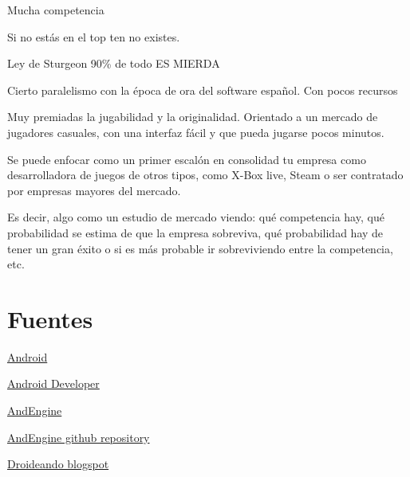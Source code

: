 \documentclass[12 pt, a4paper, twoside]{article}
\begin{document}
Mucha competencia

Si no estás en el top ten no existes.

Ley de Sturgeon 90\% de todo ES MIERDA

Cierto paralelismo con la época de ora del software español. Con pocos
recursos

Muy premiadas la jugabilidad y la originalidad. Orientado a un mercado
de jugadores casuales, con una interfaz fácil y que pueda jugarse
pocos minutos.

Se puede enfocar como un primer escalón en consolidad tu empresa como
desarrolladora de juegos de otros tipos, como X-Box live, Steam o ser
contratado por empresas mayores del mercado.

Es decir, algo como un estudio de mercado viendo:
qué competencia hay,
 qué probabilidad se estima de que la empresa sobreviva,
qué probabilidad hay de tener un gran éxito o si es más probable ir sobreviviendo entre la competencia, etc.


\section{Fuentes}
\href{http://www.android.com}{Android}

\href{http://developer.android.com/index.html}{Android Developer}

\href{http://www.andengine.org/}{AndEngine}

\href{https://github.com/nicolasgramlich/AndEngine}{AndEngine github repository}

\href{http://droideando.blogspot.com.es}{Droideando blogspot}
\end{document}
